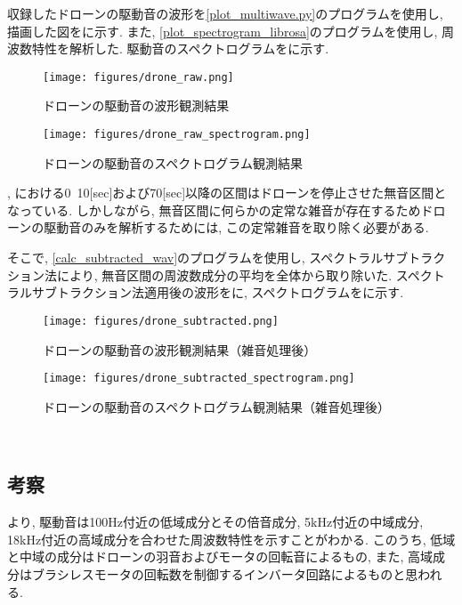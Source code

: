 収録したドローンの駆動音の波形を\ref{plot_multiwave.py}のプログラムを使用し, 描画した図をに示す. また, \ref{plot_spectrogram_librosa}のプログラムを使用し, 周波数特性を解析した. 駆動音のスペクトログラムをに示す. 

\begin{figure}[H]
\centering
\texttt{[image: figures/drone\_raw.png]}
\caption{ドローンの駆動音の波形観測結果}
\label{fig:drone_raw}
\end{figure}

\begin{figure}[H]
\centering
\texttt{[image: figures/drone\_raw\_spectrogram.png]}
\caption{ドローンの駆動音のスペクトログラム観測結果}
\label{fig:drone_raw_spectrogram}
\end{figure}

, における0~10[sec]および70[sec]以降の区間はドローンを停止させた無音区間となっている. しかしながら, 無音区間に何らかの定常な雑音が存在するためドローンの駆動音のみを解析するためには, この定常雑音を取り除く必要がある. 

そこで, \ref{calc_subtracted_wav}のプログラムを使用し, スペクトラルサブトラクション法\cite{spectral_subtraction}により, 無音区間の周波数成分の平均を全体から取り除いた. 
スペクトラルサブトラクション法適用後の波形をに, スペクトログラムをに示す. 

\begin{figure}[H]
\centering
\texttt{[image: figures/drone\_subtracted.png]}
\caption{ドローンの駆動音の波形観測結果（雑音処理後）}
\label{fig:drone_subtracted}
\end{figure}

\begin{figure}[H]
\centering
\texttt{[image: figures/drone\_subtracted\_spectrogram.png]}
\caption{ドローンの駆動音のスペクトログラム観測結果（雑音処理後）}
\label{fig:drone_subtracted_spectrogram}
\end{figure}


\
\subsection{考察}\label{consideration-drone}

より, 駆動音は100Hz付近の低域成分とその倍音成分, 5kHz付近の中域成分, 18kHz付近の高域成分を合わせた周波数特性を示すことがわかる. このうち, 低域と中域の成分はドローンの羽音およびモータの回転音によるもの, また, 高域成分はブラシレスモータの回転数を制御するインバータ回路によるものと思われる. 

